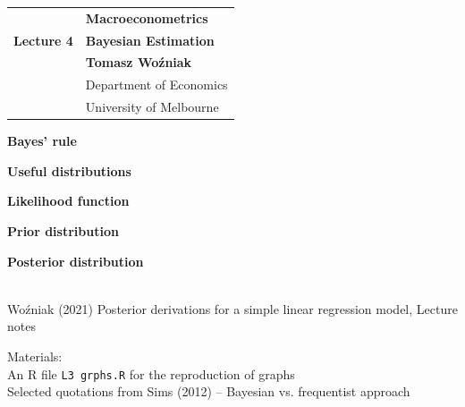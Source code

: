 \documentclass[notes,blackandwhite,mathsans]{beamer}
\begin{document}







{
\begin{frame}

\vspace{1cm}
\begin{tabular}{rl}
&\textbf{\LARGE\color{mcxs2} Macroeconometrics}\\[8ex]
\textbf{\Large\color{mcxs2} Lecture 4}&\textbf{\Large\color{mcxs3}Bayesian Estimation}\\[19ex]
&\textbf{\color{mcxs2} Tomasz Wo\'zniak}\\[1ex]
&{\small\color{mcxs3} Department of Economics}\\
&{\small\color{mcxs3}University of Melbourne}
\end{tabular}

\end{frame}
}



{
\begin{frame}

\vspace{0.5cm} \textbf{\color{mcxs3}Bayes' rule}

\bigskip\textbf{\color{mcxs2}Useful distributions}

\bigskip\textbf{\color{mcxs2}Likelihood function}

\bigskip\textbf{\color{mcxs2}Prior distribution}

\bigskip\textbf{\color{mcxs2}Posterior distribution}



 \\ \footnotesize
{\color{mcxs2}Wo\'zniak (2021) Posterior derivations for a simple linear regression model, Lecture notes}\\

\bigskip\normalsize{\color{mcxs5}Materials:}\\ \footnotesize
{\color{mcxs2}An R file} \texttt{\color{mcxs5}L3 grphs.R} {\color{mcxs2}for the reproduction of graphs}\\
{\color{mcxs2}Selected quotations from Sims (2012) -- Bayesian vs. frequentist approach}

\end{frame}
}
\end{document}
